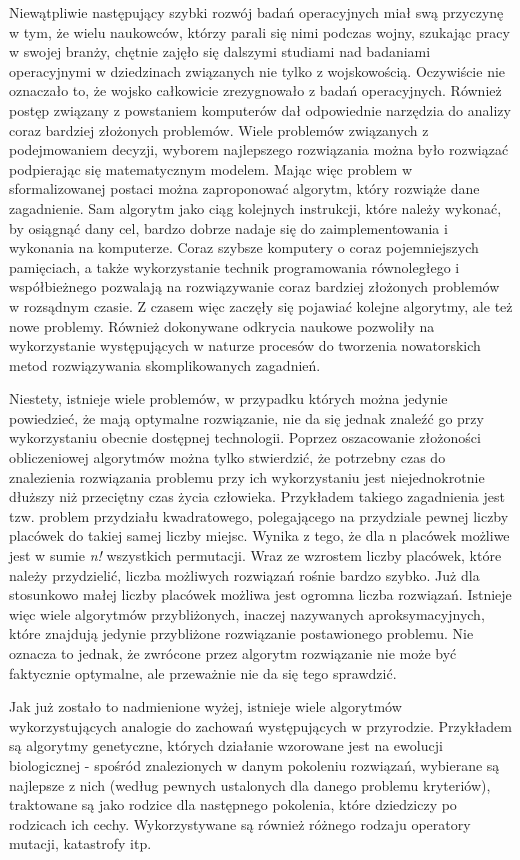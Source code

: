 Niewątpliwie następujący szybki rozwój badań operacyjnych miał swą przyczynę  w tym, że wielu naukowców, którzy parali się nimi podczas wojny, szukając pracy w swojej branży, chętnie zajęło się dalszymi studiami nad badaniami operacyjnymi w dziedzinach związanych nie tylko z wojskowością. Oczywiście nie oznaczało to, że wojsko całkowicie zrezygnowało z badań operacyjnych. Również postęp związany z powstaniem komputerów dał odpowiednie narzędzia do analizy coraz bardziej złożonych problemów. Wiele problemów związanych z podejmowaniem decyzji, wyborem najlepszego rozwiązania można było rozwiązać podpierając się matematycznym modelem. Mając więc problem w sformalizowanej postaci można zaproponować algorytm, który rozwiąże dane zagadnienie. Sam algorytm jako ciąg kolejnych instrukcji, które należy wykonać, by osiągnąć dany cel, bardzo dobrze nadaje się do zaimplementowania i wykonania na komputerze. Coraz szybsze komputery o coraz pojemniejszych pamięciach, a także wykorzystanie technik programowania równoległego i współbieżnego pozwalają na rozwiązywanie coraz bardziej złożonych problemów w rozsądnym czasie. Z czasem więc zaczęły się pojawiać kolejne algorytmy, ale też nowe problemy. Również dokonywane odkrycia naukowe pozwoliły na wykorzystanie występujących w naturze procesów do tworzenia nowatorskich metod rozwiązywania skomplikowanych zagadnień.

Niestety, istnieje wiele problemów, w przypadku których można jedynie powiedzieć, że mają optymalne rozwiązanie, nie da się jednak znaleźć go przy wykorzystaniu obecnie dostępnej technologii. Poprzez oszacowanie złożoności obliczeniowej algorytmów można tylko stwierdzić, że potrzebny czas do znalezienia rozwiązania problemu przy ich wykorzystaniu jest niejednokrotnie dłuższy niż przeciętny czas życia człowieka. Przykładem takiego zagadnienia jest tzw. problem przydziału kwadratowego, polegającego na przydziale pewnej liczby placówek do takiej samej liczby miejsc. Wynika z tego, że dla n placówek możliwe jest w sumie \textit{n!} wszystkich permutacji. Wraz ze wzrostem liczby placówek, które należy przydzielić, liczba możliwych rozwiązań rośnie bardzo szybko. Już dla stosunkowo małej liczby placówek możliwa jest ogromna liczba rozwiązań. Istnieje  więc wiele algorytmów przybliżonych, inaczej nazywanych aproksymacyjnych, które znajdują jedynie przybliżone rozwiązanie postawionego problemu. Nie oznacza to jednak, że zwrócone przez algorytm rozwiązanie nie może być faktycznie optymalne, ale przeważnie nie da się tego sprawdzić.

Jak już zostało to nadmienione wyżej, istnieje wiele algorytmów wykorzystujących analogie do zachowań występujących w przyrodzie. Przykładem są algorytmy genetyczne, których działanie wzorowane jest na ewolucji biologicznej - spośród znalezionych w danym pokoleniu rozwiązań, wybierane są najlepsze z nich (według pewnych ustalonych dla danego problemu kryteriów), traktowane są jako rodzice dla następnego pokolenia, które dziedziczy po rodzicach ich cechy. Wykorzystywane są również różnego rodzaju operatory mutacji, katastrofy itp. 

